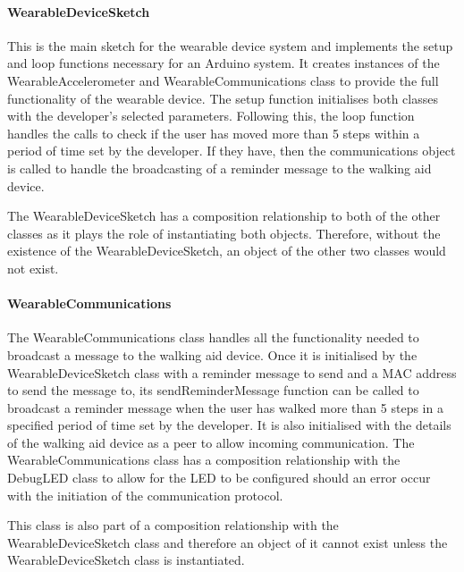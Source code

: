                         \paragraph{WearableDeviceSketch}\mbox{}
        
                            This is the main sketch for the wearable device system and implements the setup and loop functions necessary for an Arduino system. It creates instances of the WearableAccelerometer and WearableCommunications class to provide the full functionality of the wearable device. The setup function initialises both classes with the developer's selected parameters. Following this, the loop function handles the calls to check if the user has moved more than 5 steps within a period of time set by the developer. If they have, then the communications object is called to handle the broadcasting of a reminder message to the walking aid device.
        
                            The WearableDeviceSketch has a composition relationship to both of the other classes as it plays the role of instantiating both objects. Therefore, without the existence of the WearableDeviceSketch, an object of the other two classes would not exist.
        
                        \paragraph{WearableCommunications}\mbox{}
        
                            The WearableCommunications class handles all the functionality needed to broadcast a message to the walking aid device. Once it is initialised by the WearableDeviceSketch class with a reminder message to send and a MAC address to send the message to, its sendReminderMessage function can be called to broadcast a reminder message when the user has walked more than 5 steps in a specified period of time set by the developer. It is also initialised with the details of the walking aid device as a peer to allow incoming communication. The WearableCommunications class has a composition relationship with the DebugLED class to allow for the LED to be configured should an error occur with the initiation of the communication protocol.
        
                            This class is also part of a composition relationship with the WearableDeviceSketch class and therefore an object of it cannot exist unless the WearableDeviceSketch class is instantiated.
        
